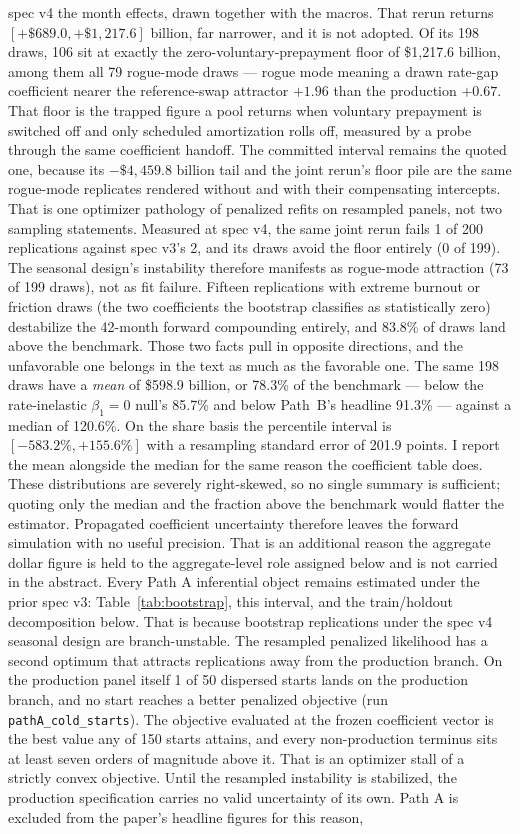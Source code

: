 \documentclass[12pt]{article}
\begin{document}
spec v4 the month effects, drawn together with the macros. That rerun returns $[+\$689.0, +\$1{,}217.6]$ billion, far narrower, and it is not adopted. Of its 198 draws, 106 sit at exactly the zero-voluntary-prepayment floor of \$1{,}217.6 billion, among them all 79 rogue-mode draws --- rogue mode meaning a drawn rate-gap coefficient nearer the reference-swap attractor $+1.96$ than the production $+0.67$. That floor is the trapped figure a pool returns when voluntary prepayment is switched off and only scheduled amortization rolls off, measured by a probe through the same coefficient handoff. The committed interval remains the quoted one, because its $-\$4{,}459.8$ billion tail and the joint rerun's floor pile are the same rogue-mode replicates rendered without and with their compensating intercepts. That is one optimizer pathology of penalized refits on resampled panels, not two sampling statements. Measured at spec v4, the same joint rerun fails 1 of 200 replications against spec v3's 2, and its draws avoid the floor entirely (0 of 199). The seasonal design's instability therefore manifests as rogue-mode attraction (73 of 199 draws), not as fit failure. Fifteen replications with extreme burnout or friction draws (the two coefficients the bootstrap classifies as statistically zero) destabilize the 42-month forward compounding entirely, and 83.8\% of draws land above the benchmark. Those two facts pull in opposite directions, and the unfavorable one belongs in the text as much as the favorable one. The same 198 draws have a \emph{mean} of \$598.9 billion, or 78.3\% of the benchmark --- below the rate-inelastic $\beta_1 = 0$ null's 85.7\% and below Path~B's headline 91.3\% --- against a median of 120.6\%. On the share basis the percentile interval is $[-583.2\%, +155.6\%]$ with a resampling standard error of 201.9 points. I report the mean alongside the median for the same reason the coefficient table does. These distributions are severely right-skewed, so no single summary is sufficient; quoting only the median and the fraction above the benchmark would flatter the estimator. Propagated coefficient uncertainty therefore leaves the forward simulation with no useful precision. That is an additional reason the aggregate dollar figure is held to the aggregate-level role assigned below and is not carried in the abstract. Every Path A inferential object remains estimated under the prior spec v3: Table~\ref{tab:bootstrap}, this interval, and the train/holdout decomposition below. That is because bootstrap replications under the spec v4 seasonal design are branch-unstable. The resampled penalized likelihood has a second optimum that attracts replications away from the production branch. On the production panel itself 1 of 50 dispersed starts lands on the production branch, and no start reaches a better penalized objective (run \texttt{pathA\_cold\_starts}). The objective evaluated at the frozen coefficient vector is the best value any of 150 starts attains, and every non-production terminus sits at least seven orders of magnitude above it. That is an optimizer stall of a strictly convex objective. Until the resampled instability is stabilized, the production specification carries no valid uncertainty of its own. Path A is excluded from the paper's headline figures for this reason, 
\end{document}
